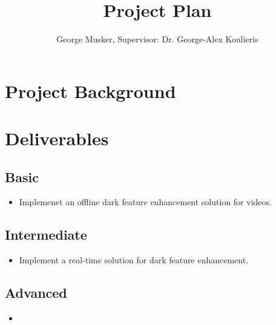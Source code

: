 \documentclass{article}
\title{Project Plan}
\author{George Musker, Supervisor: Dr. George-Alex Koulieris}
\begin{document}
	\maketitle

	\section{Project Background}
	
	

	\section{Deliverables}

	\subsection{Basic} %

		\begin{itemize} 
			\item Implemenet an offline dark feature enhancement solution for videos.
		\end{itemize}

	\subsection{Intermediate} %
 
		\begin{itemize}
			\item Implement a real-time solution for dark feature enhancement.
		\end{itemize}


	\subsection{Advanced} %

		\begin{itemize}
			\item
		\end{itemize}
\end{document}
